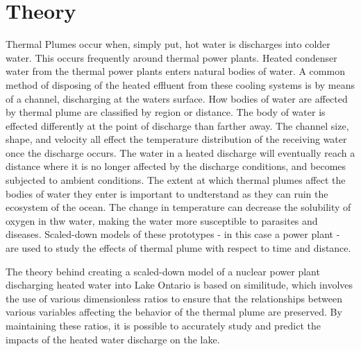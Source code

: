 \documentclass{article}
\begin{document}
\section{Theory}
\par Thermal Plumes occur when, simply put, hot water is discharges into colder water. This occurs frequently around thermal power plants. Heated condenser water from the thermal power plants enters natural bodies of water.  A common method of disposing of the heated effluent from these cooling systems is by means of a channel, discharging at the waters surface. How bodies of water are affected by thermal plume are classified by region or distance. The body of water is effected differently at the point of discharge than farther away. The channel size, shape, and velocity all effect the temperature distribution of the receiving water once the discharge occurs. The water in a heated discharge will eventually reach a distance where it is no longer affected by the discharge conditions, and becomes subjected to ambient conditions. The extent at which thermal plumes affect the bodies of water they enter is important to undterstand as they can ruin the ecosystem of the ocean. The change in temperature can decrease the solubility of oxygen in thw water, making the water more susceptible to parasites and diseases. Scaled-down models of these prototypes - in this case a power plant - are used to study the effects of thermal plume with respect to time and distance.
\par The theory behind creating a scaled-down model of a nuclear power plant discharging heated water into Lake Ontario is based on similitude, which involves the use of various dimensionless ratios to ensure that the relationships between various variables affecting the behavior of the thermal plume are preserved. By maintaining these ratios, it is possible to accurately study and predict the impacts of the heated water discharge on the lake.
\end{document}
